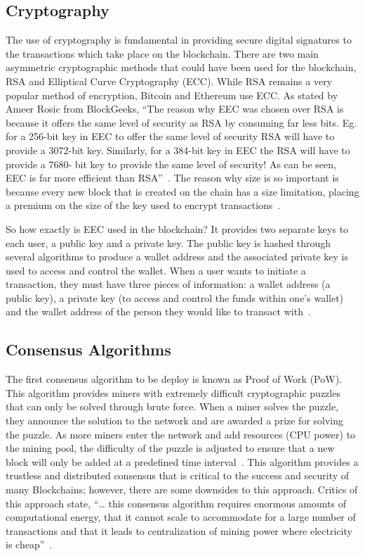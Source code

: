 \subsection{Cryptography}

The use of cryptography is fundamental in providing secure digital signatures to the transactions which take place on the blockchain. There are two main asymmetric cryptographic methods that could have been used for the blockchain, RSA and Elliptical Curve Cryptography (ECC). While RSA remains a very popular method of encryption, Bitcoin and Ethereum use ECC. As stated by Ameer Rosic from BlockGeeks, ``The reason why EEC was chosen over RSA is because it offers the same level of security as RSA by consuming far less bits. Eg. for a 256-bit key in EEC to offer the same level of security RSA will have to provide a 3072-bit key. Similarly, for a 384-bit key in EEC the RSA will have to provide a 7680- bit key to provide the same level of security! As can be seen, EEC is far more efficient than RSA''~\cite{hid-sp18-414-www-science-cryptocurrencies-cryptography}. The reason why size is so important is because every new block that is created on the chain has a size limitation, placing a premium on the size of the key used to encrypt transactions~\cite{hid-sp18-414-www-ECDSA-vs-RSA}.

So how exactly is EEC used in the blockchain? It provides two separate keys to each user, a public key and a private key. The public key is hashed through several algorithms to produce a wallet address and the associated private key is used to access and control the wallet. When a user wants to initiate a transaction, they must have three pieces of information: a wallet address (a public key), a private key (to access and control the funds within one’s wallet) and the wallet address of the person they would like to transact with~\cite{hid-sp18-414-www-science-cryptocurrencies-cryptography}.

\subsection{Consensus Algorithms}

The first consensus algorithm to be deploy is known as Proof of Work (PoW). This algorithm provides miners with extremely difficult cryptographic puzzles that can only be solved through brute force. When a miner solves the puzzle, they announce the solution to the network and are awarded a prize for solving the puzzle. As more miners enter the network and add resources (CPU power) to the mining pool, the difficulty of the puzzle is adjusted to ensure that a new block will only be added at a predefined time interval~\cite{hid-sp18-414-www-pow-vs-pos}. This algorithm provides a trustless and distributed consensus that is critical to the success and security of many Blockchains; however, there are some downsides to this approach. Critics of this approach state, ``… this consensus algorithm requires enormous amounts of computational energy, that it cannot scale to accommodate for a large number of transactions and that it leads to centralization of mining power where electricity is cheap''~\cite{hid-sp18-414-www-blockchain-consensus-protocols}.

